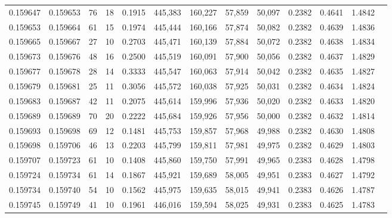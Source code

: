 \begin{tabular}{rrrrrrrrrrrrr}
0.159647 & 0.159653 &    76 &  18 &                                     0.1915 & 445,383 & 160,227 &  57,859 &  50,097 & 0.2382 & 0.4641 & 1.4842 \\
0.159653 & 0.159664 &    61 &  15 &                                     0.1974 & 445,444 & 160,166 &  57,874 &  50,082 & 0.2382 & 0.4639 & 1.4836 \\
0.159665 & 0.159667 &    27 &  10 &                                     0.2703 & 445,471 & 160,139 &  57,884 &  50,072 & 0.2382 & 0.4638 & 1.4834 \\
0.159673 & 0.159676 &    48 &  16 &                                     0.2500 & 445,519 & 160,091 &  57,900 &  50,056 & 0.2382 & 0.4637 & 1.4829 \\
0.159677 & 0.159678 &    28 &  14 &                                     0.3333 & 445,547 & 160,063 &  57,914 &  50,042 & 0.2382 & 0.4635 & 1.4827 \\
0.159679 & 0.159681 &    25 &  11 &                                     0.3056 & 445,572 & 160,038 &  57,925 &  50,031 & 0.2382 & 0.4634 & 1.4824 \\
0.159683 & 0.159687 &    42 &  11 &                                     0.2075 & 445,614 & 159,996 &  57,936 &  50,020 & 0.2382 & 0.4633 & 1.4820 \\
0.159689 & 0.159689 &    70 &  20 &                                     0.2222 & 445,684 & 159,926 &  57,956 &  50,000 & 0.2382 & 0.4632 & 1.4814 \\
0.159693 & 0.159698 &    69 &  12 &                                     0.1481 & 445,753 & 159,857 &  57,968 &  49,988 & 0.2382 & 0.4630 & 1.4808 \\
0.159698 & 0.159706 &    46 &  13 &                                     0.2203 & 445,799 & 159,811 &  57,981 &  49,975 & 0.2382 & 0.4629 & 1.4803 \\
0.159707 & 0.159723 &    61 &  10 &                                     0.1408 & 445,860 & 159,750 &  57,991 &  49,965 & 0.2383 & 0.4628 & 1.4798 \\
0.159724 & 0.159734 &    61 &  14 &                                     0.1867 & 445,921 & 159,689 &  58,005 &  49,951 & 0.2383 & 0.4627 & 1.4792 \\
0.159734 & 0.159740 &    54 &  10 &                                     0.1562 & 445,975 & 159,635 &  58,015 &  49,941 & 0.2383 & 0.4626 & 1.4787 \\
0.159745 & 0.159749 &    41 &  10 &                                     0.1961 & 446,016 & 159,594 &  58,025 &  49,931 & 0.2383 & 0.4625 & 1.4783 \\

\end{tabular}
